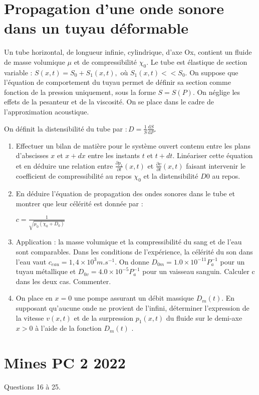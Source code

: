 \documentclass{article}
\begin{document}
\section{Propagation d'une onde sonore dans un tuyau déformable}




Un tube horizontal, de longueur infinie, cylindrique, d’axe Ox, contient un fluide de masse
volumique $\mu$ et de compressibilité $\chi_0$.
Le tube est élastique de section variable : $S(x,t)=S_{0}+S_{1}(x,t),$ où $ S_{1}(x,t) << S_{0}.$ On suppose
que l’équation de comportement du tuyau permet de définir sa section comme fonction de la
pression uniquement, sous la forme $S = S(P)$.
On néglige les effets de la pesanteur et de la viscosité. On se place dans le cadre de l’approximation acoustique.

On définit la distensibilité du tube par $:D={\frac{1}{S}}{\frac{\mathrm{d}S}{\mathrm{d}P}}.$

\begin{enumerate}
  \item Effectuer un bilan de matière pour le système ouvert contenu entre les plans d’abscisses
  $x$ et $x+ dx $ entre les instants $t$ et $t+dt$. Linéariser cette équation et en déduire une relation entre ${\frac{\partial p_{1}}{\partial t}}(x,t)$ et ${\frac{\partial v}{\partial t}}(x,t)$
  faisant intervenir le coefficient de compressibilité au repos $\chi_0$ et
 la distensibilité $D0$ au repos.
 \item En déduire l’équation de propagation des ondes sonores dans le tube et montrer que leur
 célérité est donnée par :

 $c={\frac{1}{\sqrt{\mu_{0}(\chi_{0}+D_{0})}}}$

  \item Application : la masse volumique et la compressibilité du sang et de l'eau sont comparables.
  Dans les conditions de l’expérience, la célérité du son dans l’eau vaut $c_{eau} = 1,4 \times 10^3 m.s^{-1}$. 
  On donne $D_{0m}=1.0\times10^{-11} P_a^{-1}$ pour un tuyau métallique et $D_{0v}=4.0\times10^{-5} P_a^{-1}$
  pour un vaisseau sanguin.
  Calculer c dans les deux cas. Commenter.

  \item On place en $x = 0$ une pompe assurant un débit massique $D_m(t)$. En supposant qu’aucune
  onde ne provient de l’infini, déterminer l’expression de la vitesse $v(x,t)$ et de la surpression
  $p_1(x,t)$ du fluide sur le demi-axe $x > 0$ à l’aide de la fonction $D_m (t)$ .

\end{enumerate}


\section{ Mines PC 2 2022} 

Questions 16 à 25. 
 
\end{document}
